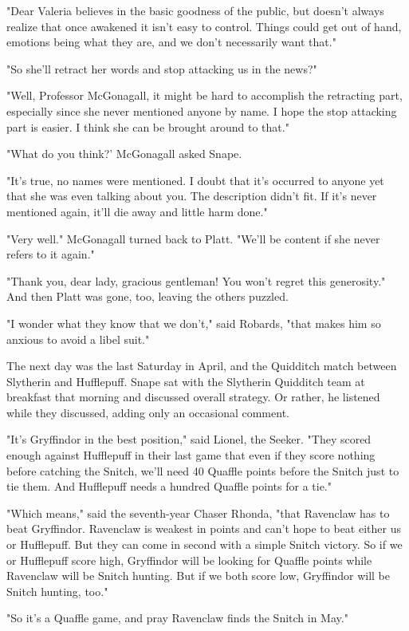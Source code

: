 "Dear Valeria believes in the basic goodness of the public, but doesn't always realize that once awakened it isn't easy to control. Things could get out of hand, emotions being what they are, and we don't necessarily want that."

"So she'll retract her words and stop attacking us in the news?"

"Well, Professor McGonagall, it might be hard to accomplish the retracting part, especially since she never mentioned anyone by name. I hope the stop attacking part is easier. I think she can be brought around to that."

"What do you think?' McGonagall asked Snape.

"It's true, no names were mentioned. I doubt that it's occurred to anyone yet that she was even talking about you. The description didn't fit. If it's never mentioned again, it'll die away and little harm done."

"Very well." McGonagall turned back to Platt. "We'll be content if she never refers to it again."

"Thank you, dear lady, gracious gentleman! You won't regret this generosity." And then Platt was gone, too, leaving the others puzzled.

"I wonder what they know that we don't," said Robards, "that makes him so anxious to avoid a libel suit."

The next day was the last Saturday in April, and the Quidditch match between Slytherin and Hufflepuff. Snape sat with the Slytherin Quidditch team at breakfast that morning and discussed overall strategy. Or rather, he listened while they discussed, adding only an occasional comment.

"It's Gryffindor in the best position," said Lionel, the Seeker. "They scored enough against Hufflepuff in their last game that even if they score nothing before catching the Snitch, we'll need 40 Quaffle points before the Snitch just to tie them. And Hufflepuff needs a hundred Quaffle points for a tie."

"Which means," said the seventh-year Chaser Rhonda, "that Ravenclaw has to beat Gryffindor. Ravenclaw is weakest in points and can't hope to beat either us or Hufflepuff. But they can come in second with a simple Snitch victory. So if we or Hufflepuff score high, Gryffindor will be looking for Quaffle points while Ravenclaw will be Snitch hunting. But if we both score low, Gryffindor will be Snitch hunting, too."

"So it's a Quaffle game, and pray Ravenclaw finds the Snitch in May."

